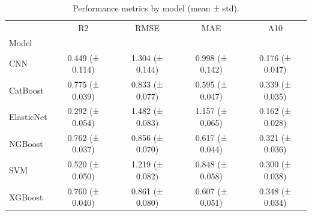 \begin{table}
\centering
\caption{Performance metrics by model (mean ± std).}
\label{tab:model_metrics_summary}
\begin{tabular}{lcccc}
\toprule
{} &               R2 &             RMSE &              MAE &              A10 \\
Model      &                  &                  &                  &                  \\
\midrule
CNN        &  0.449 (± 0.114) &  1.304 (± 0.144) &  0.998 (± 0.142) &  0.176 (± 0.047) \\
CatBoost   &  0.775 (± 0.039) &  0.833 (± 0.077) &  0.595 (± 0.047) &  0.339 (± 0.035) \\
ElasticNet &  0.292 (± 0.054) &  1.482 (± 0.083) &  1.157 (± 0.065) &  0.162 (± 0.028) \\
NGBoost    &  0.762 (± 0.037) &  0.856 (± 0.070) &  0.617 (± 0.044) &  0.321 (± 0.036) \\
SVM        &  0.520 (± 0.050) &  1.219 (± 0.082) &  0.848 (± 0.058) &  0.300 (± 0.038) \\
XGBoost    &  0.760 (± 0.040) &  0.861 (± 0.080) &  0.607 (± 0.051) &  0.348 (± 0.034) \\
\bottomrule
\end{tabular}
\end{table}
